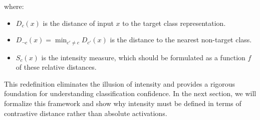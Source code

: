 where:

\begin{itemize}
    \item \( D_c(x) \) is the distance of input \( x \) to the target class representation.
    \item \( D_{\neg c}(x) = \min_{c' \neq c} D_{c'}(x) \) is the distance to the nearest non-target class.
    \item \( S_c(x) \) is the intensity measure, which should be formulated as a function \( f \) of these relative distances.
\end{itemize}


This redefinition eliminates the illusion of intensity and provides a rigorous foundation for understanding classification confidence. In the next section, we will formalize this framework and show why intensity must be defined in terms of contrastive distance rather than absolute activations.
